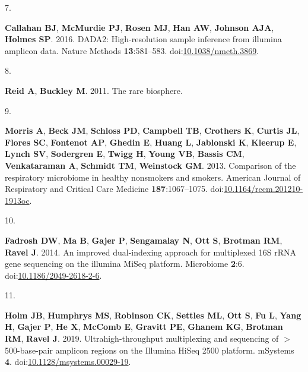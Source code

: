 \documentclass[
]{article}
\newlength{\cslhangindent}
\newlength{\csllabelwidth}
\newlength{\cslentryspacingunit} %
\newenvironment{CSLReferences}[2] %
 {%
  \setlength{\parindent}{0pt}
  \ifodd #1
  \let\oldpar\par
  \def\par{\hangindent=\cslhangindent\oldpar}
  \fi
  \setlength{\parskip}{#2\cslentryspacingunit}
 }%
 {}
\newcommand{\CSLLeftMargin}[1]{\parbox[t]{\csllabelwidth}{#1}}
\newcommand{\CSLRightInline}[1]{\parbox[t]{\linewidth - \csllabelwidth}{#1}\break}
\begin{document}
\begin{CSLReferences}{0}{1}
\leavevmode{}%
\CSLLeftMargin{7. }%
\CSLRightInline{\textbf{Callahan BJ}, \textbf{McMurdie PJ},
\textbf{Rosen MJ}, \textbf{Han AW}, \textbf{Johnson AJA}, \textbf{Holmes
SP}. 2016. {DADA}2: High-resolution sample inference from illumina
amplicon data. Nature Methods \textbf{13}:581--583.
doi:\href{https://doi.org/10.1038/nmeth.3869}{10.1038/nmeth.3869}.}

\leavevmode{}%
\CSLLeftMargin{8. }%
\CSLRightInline{\textbf{Reid A}, \textbf{Buckley M}. 2011. The rare
biosphere.}

\leavevmode{}%
\CSLLeftMargin{9. }%
\CSLRightInline{\textbf{Morris A}, \textbf{Beck JM}, \textbf{Schloss
PD}, \textbf{Campbell TB}, \textbf{Crothers K}, \textbf{Curtis JL},
\textbf{Flores SC}, \textbf{Fontenot AP}, \textbf{Ghedin E},
\textbf{Huang L}, \textbf{Jablonski K}, \textbf{Kleerup E},
\textbf{Lynch SV}, \textbf{Sodergren E}, \textbf{Twigg H}, \textbf{Young
VB}, \textbf{Bassis CM}, \textbf{Venkataraman A}, \textbf{Schmidt TM},
\textbf{Weinstock GM}. 2013. Comparison of the respiratory microbiome in
healthy nonsmokers and smokers. American Journal of Respiratory and
Critical Care Medicine \textbf{187}:1067--1075.
doi:\href{https://doi.org/10.1164/rccm.201210-1913oc}{10.1164/rccm.201210-1913oc}.}

\leavevmode{}%
\CSLLeftMargin{10. }%
\CSLRightInline{\textbf{Fadrosh DW}, \textbf{Ma B}, \textbf{Gajer P},
\textbf{Sengamalay N}, \textbf{Ott S}, \textbf{Brotman RM},
\textbf{Ravel J}. 2014. An improved dual-indexing approach for
multiplexed 16S {rRNA} gene sequencing on the illumina {MiSeq} platform.
Microbiome \textbf{2}:6.
doi:\href{https://doi.org/10.1186/2049-2618-2-6}{10.1186/2049-2618-2-6}.}

\leavevmode{}%
\CSLLeftMargin{11. }%
\CSLRightInline{\textbf{Holm JB}, \textbf{Humphrys MS}, \textbf{Robinson
CK}, \textbf{Settles ML}, \textbf{Ott S}, \textbf{Fu L}, \textbf{Yang
H}, \textbf{Gajer P}, \textbf{He X}, \textbf{McComb E}, \textbf{Gravitt
PE}, \textbf{Ghanem KG}, \textbf{Brotman RM}, \textbf{Ravel J}. 2019.
Ultrahigh-throughput multiplexing and sequencing of \(>\)500-base-pair
amplicon regions on the {Illumina} {HiSeq} 2500 platform. {mSystems}
\textbf{4}.
doi:\href{https://doi.org/10.1128/msystems.00029-19}{10.1128/msystems.00029-19}.}


\end{CSLReferences}
\end{document}
